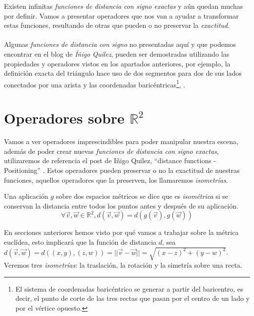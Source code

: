 Existen infinitas \textit{funciones de distancia con signo exactas} y aún quedan muchas por definir. Vamos a presentar operadores que nos van a ayudar a transformar estas funciones, resultando de otras que pueden o no preservar la \textit{exactitud}.\\\\
Algunas \textit{funciones de distancia con signo} no presentadas aquí y que podemos encontrar en el blog de \textit{Íñigo Quilez}, pueden ser demostradas utilizando las propiedades y operadores vistos en los apartados anteriores, por ejemplo, la definición exacta del triángulo hace uso de dos segmentos para dos de sus lados conectados por una arista y las coordenadas baricéntricas\footnote{El sistema de coordenadas baricéntrico se generar a partir del baricentro, es decir, el punto de corte de las tres rectas que pasan por el centro de un lado y por el vértice opuesto.}, \cite{36669}.

\section{Operadores sobre \(\mathbb{R}^2\)}
Vamos a ver operadores imprescindibles para poder manipular nuestra escena, además de poder crear nuevas \textit{funciones de distancia con signo exactas}, utilizaremos de referencia el post de Iñigo Quilez, \enquote{distance functions - Positioning} \cite{3ddistinigo}. Estos operadores pueden preservar o no la exactitud de nuestras funciones, aquellos operadores que la preserven, los llamaremos \textit{isometrías}.

\begin{definition}
Una aplicación \(g\) sobre dos espacios métricos se dice que es \textit{isométrica} si se conservan la distancia entre todos los puntos antes y después de su aplicación. \[\forall \Vec{v},\Vec{w} \in\mathbb{R}^2, d(\Vec{v},\Vec{w})=d(g(\Vec{v}),g(\Vec{w}))\]
\end{definition}

En secciones anteriores hemos visto por qué vamos a trabajar sobre la métrica euclídea, esto implicará que la función de distancia \(d\), sea  \(d(\Vec{v},\Vec{w})=d((x,y),(z,w))=\vert\vert \Vec{v}-\Vec{w}\vert\vert=\sqrt{(x-z)^2+(y-w)^2}\). Veremos tres \textit{isometrías}: la traslación, la rotación y la simetría sobre una recta.

